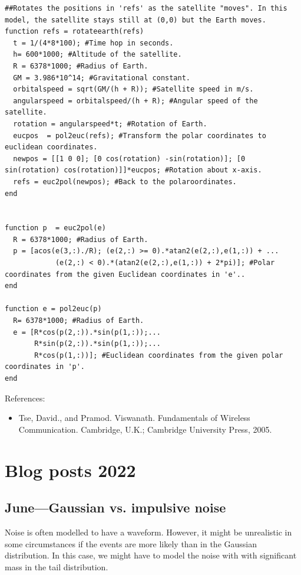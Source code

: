 \documentclass{article}
\begin{document}
\begin{verbatim}
##Rotates the positions in 'refs' as the satellite "moves". In this model, the satellite stays still at (0,0) but the Earth moves.
function refs = rotateearth(refs)
  t = 1/(4*8*100); #Time hop in seconds.
  h= 600*1000; #Altitude of the satellite.
  R = 6378*1000; #Radius of Earth.
  GM = 3.986*10^14; #Gravitational constant.
  orbitalspeed = sqrt(GM/(h + R)); #Satellite speed in m/s.
  angularspeed = orbitalspeed/(h + R); #Angular speed of the satellite.
  rotation = angularspeed*t; #Rotation of Earth.
  eucpos  = pol2euc(refs); #Transform the polar coordinates to euclidean coordinates.
  newpos = [[1 0 0]; [0 cos(rotation) -sin(rotation)]; [0 sin(rotation) cos(rotation)]]*eucpos; #Rotation about x-axis.  
  refs = euc2pol(newpos); #Back to the polaroordinates.
end


function p  = euc2pol(e)
  R = 6378*1000; #Radius of Earth.
  p = [acos(e(3,:)./R); (e(2,:) >= 0).*atan2(e(2,:),e(1,:)) + ...
			(e(2,:) < 0).*(atan2(e(2,:),e(1,:)) + 2*pi)]; #Polar coordinates from the given Euclidean coordinates in 'e'..
end

function e = pol2euc(p)
  R= 6378*1000; #Radius of Earth.
  e = [R*cos(p(2,:)).*sin(p(1,:));...
       R*sin(p(2,:)).*sin(p(1,:));...
       R*cos(p(1,:))]; #Euclidean coordinates from the given polar coordinates in 'p'.
end

\end{verbatim}
References:
\begin{itemize}
\item Tse, David., and Pramod. Viswanath. Fundamentals of Wireless Communication. Cambridge, U.K.; Cambridge University Press, 2005.
\end{itemize}

                  \section{Blog posts 2022}


\subsection{June---Gaussian vs. impulsive noise}


Noise is often modelled to have a  waveform. However, it might be unrealistic in some circumstances if the  events are more likely than in the Gaussian distribution. In this case, we might have to model the noise with  with significant mass in the tail distribution. 
\end{document}
